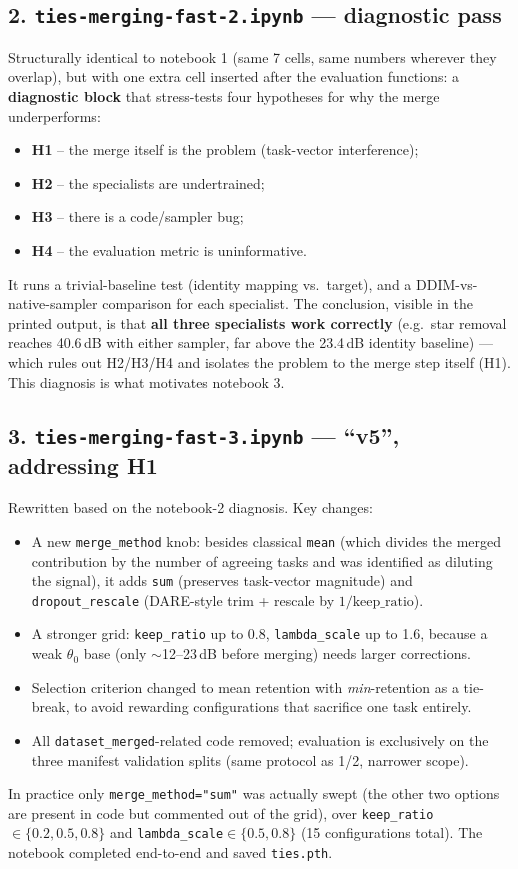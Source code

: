 \documentclass[11pt]{article}
\begin{document}
\subsection*{2. \texttt{ties-merging-fast-2.ipynb} --- diagnostic pass}
Structurally identical to notebook 1 (same 7 cells, same numbers wherever
they overlap), but with one extra cell inserted after the evaluation
functions: a \textbf{diagnostic block} that stress-tests four hypotheses for
why the merge underperforms:
\begin{itemize}[nosep]
  \item \textbf{H1} -- the merge itself is the problem (task-vector interference);
  \item \textbf{H2} -- the specialists are undertrained;
  \item \textbf{H3} -- there is a code/sampler bug;
  \item \textbf{H4} -- the evaluation metric is uninformative.
\end{itemize}
It runs a trivial-baseline test (identity mapping vs.\ target), and a
DDIM-vs-native-sampler comparison for each specialist. The conclusion,
visible in the printed output, is that \textbf{all three specialists work
correctly} (e.g.\ star removal reaches 40.6\,dB with either sampler, far
above the 23.4\,dB identity baseline) — which rules out H2/H3/H4 and isolates
the problem to the merge step itself (H1). This diagnosis is what motivates
notebook 3.

\subsection*{3. \texttt{ties-merging-fast-3.ipynb} --- ``v5'', addressing H1}
Rewritten based on the notebook-2 diagnosis. Key changes:
\begin{itemize}[nosep]
  \item A new \texttt{merge\_method} knob: besides classical \texttt{mean}
  (which divides the merged contribution by the number of agreeing tasks and
  was identified as diluting the signal), it adds \texttt{sum} (preserves
  task-vector magnitude) and \texttt{dropout\_rescale} (DARE-style trim +
  rescale by $1/\text{keep\_ratio}$).
  \item A stronger grid: \texttt{keep\_ratio} up to 0.8, \texttt{lambda\_scale}
  up to 1.6, because a weak $\theta_0$ base (only $\sim$12--23\,dB before
  merging) needs larger corrections.
  \item Selection criterion changed to mean retention with \emph{min}-retention
  as a tie-break, to avoid rewarding configurations that sacrifice one task
  entirely.
  \item All \texttt{dataset\_merged}-related code removed; evaluation is
  exclusively on the three manifest validation splits (same protocol as 1/2,
  narrower scope).
\end{itemize}
In practice only \texttt{merge\_method="sum"} was actually swept (the other
two options are present in code but commented out of the grid), over
\texttt{keep\_ratio}$\in\{0.2,0.5,0.8\}$ and
\texttt{lambda\_scale}$\in\{0.5,0.8\}$ (15 configurations total). The
notebook completed end-to-end and saved \texttt{ties.pth}.
\end{document}
